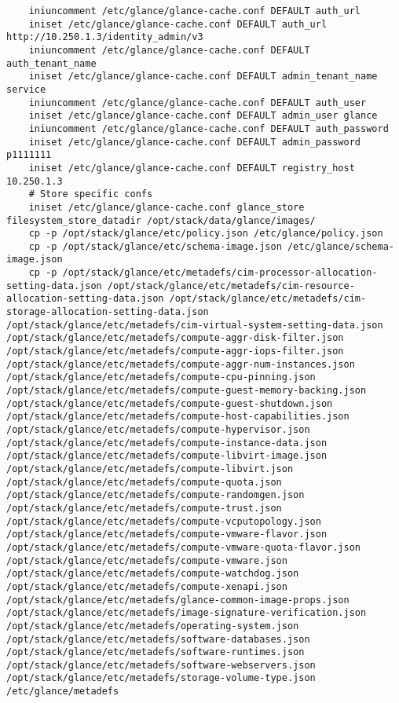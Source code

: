 \documentclass[a4paper,left=1.5cm,right=1.5cm,11pt]{article}
\begin{document}
\begin{lstlisting}
    iniuncomment /etc/glance/glance-cache.conf DEFAULT auth_url
    iniset /etc/glance/glance-cache.conf DEFAULT auth_url http://10.250.1.3/identity_admin/v3
    iniuncomment /etc/glance/glance-cache.conf DEFAULT auth_tenant_name
    iniset /etc/glance/glance-cache.conf DEFAULT admin_tenant_name service
    iniuncomment /etc/glance/glance-cache.conf DEFAULT auth_user
    iniset /etc/glance/glance-cache.conf DEFAULT admin_user glance
    iniuncomment /etc/glance/glance-cache.conf DEFAULT auth_password
    iniset /etc/glance/glance-cache.conf DEFAULT admin_password p1111111
    iniset /etc/glance/glance-cache.conf DEFAULT registry_host 10.250.1.3
	# Store specific confs
    iniset /etc/glance/glance-cache.conf glance_store filesystem_store_datadir /opt/stack/data/glance/images/
	cp -p /opt/stack/glance/etc/policy.json /etc/glance/policy.json
    cp -p /opt/stack/glance/etc/schema-image.json /etc/glance/schema-image.json
    cp -p /opt/stack/glance/etc/metadefs/cim-processor-allocation-setting-data.json /opt/stack/glance/etc/metadefs/cim-resource-allocation-setting-data.json /opt/stack/glance/etc/metadefs/cim-storage-allocation-setting-data.json /opt/stack/glance/etc/metadefs/cim-virtual-system-setting-data.json /opt/stack/glance/etc/metadefs/compute-aggr-disk-filter.json /opt/stack/glance/etc/metadefs/compute-aggr-iops-filter.json /opt/stack/glance/etc/metadefs/compute-aggr-num-instances.json /opt/stack/glance/etc/metadefs/compute-cpu-pinning.json /opt/stack/glance/etc/metadefs/compute-guest-memory-backing.json /opt/stack/glance/etc/metadefs/compute-guest-shutdown.json /opt/stack/glance/etc/metadefs/compute-host-capabilities.json /opt/stack/glance/etc/metadefs/compute-hypervisor.json /opt/stack/glance/etc/metadefs/compute-instance-data.json /opt/stack/glance/etc/metadefs/compute-libvirt-image.json /opt/stack/glance/etc/metadefs/compute-libvirt.json /opt/stack/glance/etc/metadefs/compute-quota.json /opt/stack/glance/etc/metadefs/compute-randomgen.json /opt/stack/glance/etc/metadefs/compute-trust.json /opt/stack/glance/etc/metadefs/compute-vcputopology.json /opt/stack/glance/etc/metadefs/compute-vmware-flavor.json /opt/stack/glance/etc/metadefs/compute-vmware-quota-flavor.json /opt/stack/glance/etc/metadefs/compute-vmware.json /opt/stack/glance/etc/metadefs/compute-watchdog.json /opt/stack/glance/etc/metadefs/compute-xenapi.json /opt/stack/glance/etc/metadefs/glance-common-image-props.json /opt/stack/glance/etc/metadefs/image-signature-verification.json /opt/stack/glance/etc/metadefs/operating-system.json /opt/stack/glance/etc/metadefs/software-databases.json /opt/stack/glance/etc/metadefs/software-runtimes.json /opt/stack/glance/etc/metadefs/software-webservers.json /opt/stack/glance/etc/metadefs/storage-volume-type.json /etc/glance/metadefs



\end{lstlisting}
\end{document}
